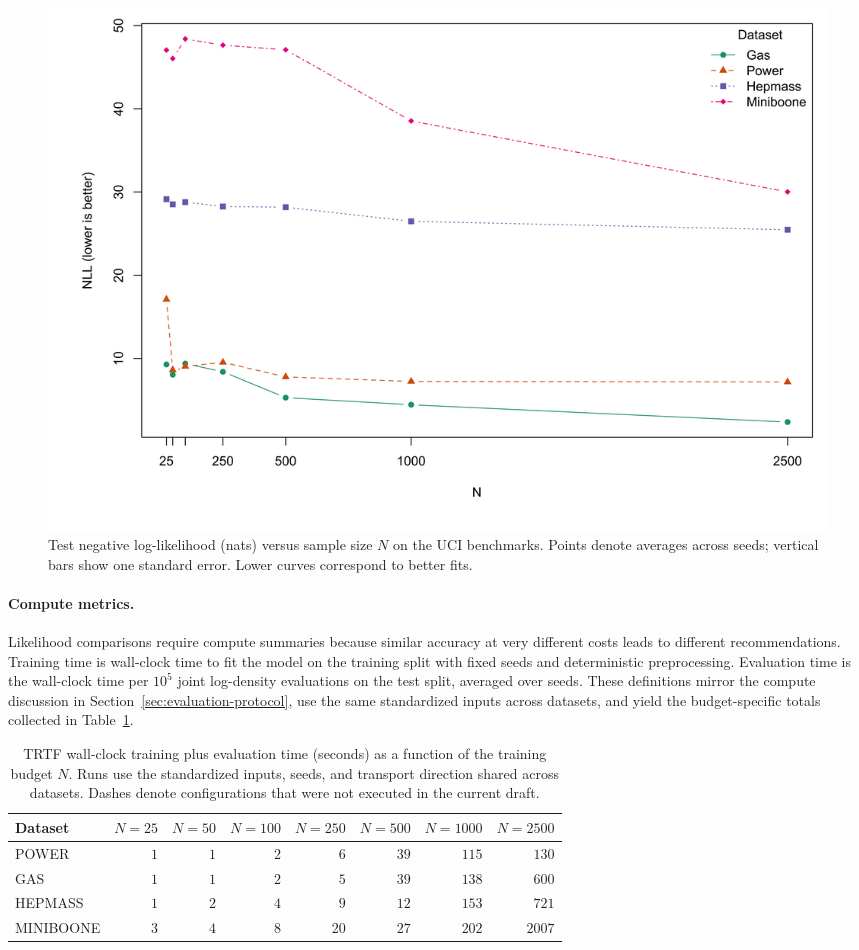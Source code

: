 \documentclass[11pt,a4paper,twoside]{book}\usepackage[]{graphicx}\usepackage[]{xcolor}
\begin{document}
\begin{figure}[htbp]
  \centering
  \includegraphics[width=0.85\linewidth]{../code/experiments/NF/main/results/N_sensitivity_all.png}
  \caption{Test negative log-likelihood (nats) versus sample size $N$ on the UCI benchmarks. Points denote averages across seeds; vertical bars show one standard error. Lower curves correspond to better fits.}
  \label{fig:n-sensitivity}
\end{figure}

\paragraph{Compute metrics.} Likelihood comparisons require compute summaries because similar accuracy at very different costs leads to different recommendations. Training time is wall-clock time to fit the model on the training split with fixed seeds and deterministic preprocessing. Evaluation time is the wall-clock time per $10^5$ joint log-density evaluations on the test split, averaged over seeds. These definitions mirror the compute discussion in Section~\ref{sec:evaluation-protocol}, use the same standardized inputs across datasets, and yield the budget-specific totals collected in Table~\ref{tab:real-compute}.

\begin{table}[htbp]
  \centering
  \caption{TRTF wall-clock training plus evaluation time (seconds) as a function of the training budget $N$. Runs use the standardized inputs, seeds, and transport direction shared across datasets. Dashes denote configurations that were not executed in the current draft.}
  \label{tab:real-compute}
  \begin{tabular}{lrrrrrrr}
    \hline
    Dataset & $N=25$ & $N=50$ & $N=100$ & $N=250$ & $N=500$ & $N=1000$ & $N=2500$ \\
    \hline
    POWER     & $1$ & $1$ & $2$ & $6$ & $39$ & $115$ & $130$ \\
    GAS       & $1$ & $1$ & $2$ & $5$ & $39$ & $138$ & $600$ \\
    HEPMASS   & $1$ & $2$ & $4$ & $9$ & $12$ & $153$ & $721$ \\
    MINIBOONE & $3$ & $4$ & $8$ & $20$ & $27$ & $202$ & $2007$ \\
    \hline
  \end{tabular}
\end{table}
\end{document}
